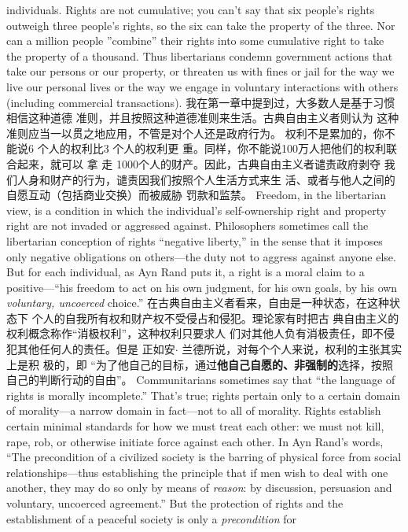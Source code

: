 \begin{paracol}{2}
individuals. Rights are not cumulative; you can't say that six
people's rights outweigh three people's rights, so the six can
take the property of the three. Nor can a million people ''combine'' their rights into some cumulative right to take the property of a thousand. Thus libertarians condemn government
actions that take our persons or our property, or threaten us
with fines or jail for the way we live our personal lives or the
way we engage in voluntary interactions with others (including
commercial transactions).
\switchcolumn
我在第一章中提到过，大多数人是基于习惯相信这种道德
准则，并且按照这种道德准则来生活。古典自由主义者则认为
这种准则应当一以贯之地应用，不管是对个人还是政府行为。
权利不是累加的，你不能说6 个人的权利比3 个人的权利更
重。同样，你不能说100万人把他们的权利联合起来，就可以
拿 走 1000个人的财产。因此，古典自由主义者谴责政府剥夺
我们人身和财产的行为，谴责因我们按照个人生活方式来生
活、或者与他人之间的自愿互动（包括商业交换）而被威胁
罚款和监禁。
\switchcolumn*
Freedom, in the libertarian view, is a condition in which the
individual's self-ownership right and property right are not invaded or aggressed against. Philosophers sometimes call the libertarian conception of rights ``negative liberty,'' in the sense that
it imposes only negative obligations on others---the duty not to aggress against anyone else. But for each individual, as Ayn
Rand puts it, a right is a moral claim to a positive---``his freedom to act on his own judgment, for his own goals, by his own \textit{voluntary, uncoerced} choice.''
\switchcolumn
在古典自由主义者看来，自由是一种状态，在这种状态下
个人的自我所有权和财产权不受侵占和侵犯。理论家有时把古
典自由主义的权利概念称作“消极权利”，这种权利只要求人
们对其他人负有消极责任，即不侵犯其他任何人的责任。但是
正如安$\cdot$ 兰德所说，对每个个人来说，权利的主张其实上是积
极的，即 “为了他自己的目标，通过\textbf{他自己自愿的、非强制的}选择，按照自己的判断行动的自由”。
\switchcolumn*
Communitarians sometimes say that ``the language of rights
is morally incomplete.'' That's true; rights pertain only to a certain domain of morality---a narrow domain in fact---not to all
of morality. Rights establish certain minimal standards for how
we must treat each other: we must not kill, rape, rob, or otherwise initiate force against each other. In Ayn Rand's words,
``The precondition of a civilized society is the barring of physical
force from social relationships---thus establishing the principle that if men wish to deal with one another, they may do so only
by means of \textit{reason}: by discussion, persuasion and voluntary, uncoerced agreement.'' But the protection of rights and the establishment of a peaceful society is only a \textit{precondition} for

\end{paracol}
